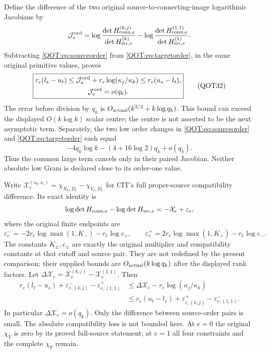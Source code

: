\documentclass[11pt,a4paper]{article}
\begin{document}
Define the difference of the two original source-to-connecting-image logarithmic Jacobians by
\[
 \mathcal J_e^{\rm ord}=
 \log\frac{\det H_{{\rm conn},e}^{(k,j)}}{\det H_{{\rm src},e}^{(k)}}
 -\log\frac{\det H_{{\rm conn},e}^{(1,1)}}{\det H_{{\rm src},e}^{(1)}}.
\]
Subtracting \eqref{QOT:eq:sourceorder} from \eqref{QOT:eq:targetorder}, in the same original primitive values, proves
\begin{equation}
\boxed{\begin{gathered}
 r_e(l_s-u_t)\le
 \mathcal J_e^{\rm ord}+r_e\log(\kappa_j/\kappa_k)
 \le r_e(u_s-l_t),\\
 \mathcal J_e^{\rm ord}=o(q_k).
\end{gathered}}
\label{QOT:eq:paired}
\tag{QOT32}
\end{equation}
The error before division by $q_k$ is $O_{\rm actual}(k^{3/2}+k\log q_k)$. This bound can exceed the displayed $O(k\log k)$ scalar centre; the centre is not asserted to be the next asymptotic term. Separately, the two low order changes in \eqref{QOT:eq:sourceorder} and \eqref{QOT:eq:targetorder} each equal
\begin{equation}
 -4q_k\log k-(4+16\log2)q_k+o(q_k).
 \label{QOT:eq:lowdual}
\tag{QOT33}
\end{equation}
Thus the common large term cancels only in their paired Jacobian. Neither absolute low Gram is declared close to its order-one value.

Write $\mathcal X_e^{(s_0,s_1)}=\chi_{X_k,D_e}-\chi_{Y_e,D_e}$ for CIT's full proper-source compatibility difference. Its exact identity is
\[
 \log\det H_{{\rm conn},e}-\log\det H_{{\rm src},e}
 =-\mathcal X_e+\varepsilon_e,
\]
where the original finite endpoints are
\[
 \varepsilon_e^-=-2r_e\log\max(1,K_-)-r_e\log c_+,
 \qquad
 \varepsilon_e^+=2r_e\log\max(1,K_+)-r_e\log c_-.
\]
The constants $K_\pm,c_\pm$ are exactly the original multiplier and compatibility constants at that cutoff and source pair. They are not redefined by the present comparison; their supplied bounds are $O_{\rm actual}(k\log q_k)$ after the displayed rank factors.
Let $\Delta\mathcal X_e=\mathcal X_e^{(k,j)}-\mathcal X_e^{(1,1)}$. Then
\begin{equation}
\begin{split}
 r_e(l_t-u_s)+\varepsilon_{e,(k,j)}^-
                  -\varepsilon_{e,(1,1)}^+
 &\le\Delta\mathcal X_e-r_e\log(\kappa_j/\kappa_k)\\
 &\le r_e(u_t-l_s)+\varepsilon_{e,(k,j)}^+
                  -\varepsilon_{e,(1,1)}^- .
\end{split}\label{QOT:eq:chi}
\tag{QOT34}
\end{equation}
In particular $\Delta\mathcal X_e=o(q_k)$. Only the difference between source-order pairs is small. The absolute compatibility loss is not bounded here. At $e=0$ the original $\chi_Y$ is zero by its proved full-source statement; at $e=1$ all four constraints and the complete $\chi_Y$ remain.
\end{document}
